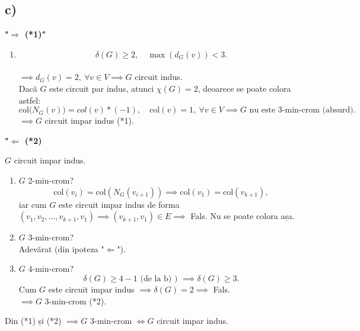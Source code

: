 \documentclass[a4paper,12pt]{article}
\begin{document}
\subsection*{c)}
\textbf{"$\Rightarrow$ (*1)"}\\

\begin{enumerate}
    \item 
        \[\delta(G) \geq 2, \quad \max(d_G(v)) < 3.\] \\
        $\implies d_G(v) = 2, \ \forall v \in V \implies G$ circuit indus. \\

    Dacă $G$ este circuit par indus, atunci $\chi(G) = 2$, deoarece se poate colora astfel: \\
    \[
    \text{col}\big(N_G(v)\big) = col(v) * (-1), \quad \text{col}(v) = 1, \ \forall v \in V \implies G \text{ nu este 3-min-crom (absurd).}
    \]
    $\implies G$ circuit impar indus (*1).
\end{enumerate}

\textbf{"$\Leftarrow$ (*2)}

$G$ circuit impar indus. \\
\begin{enumerate}
    \item $G$ 2-min-crom? \\
    \[
    \text{col}(v_i) = \text{col}(N_G(v_{i+1})) \implies \text{col}(v_1) = \text{col}(v_{k+1}),
    \]
    iar cum $G$ este circuit impar indus de forma $(v_1, v_2, \dots, v_{k+1}, v_1) \implies (v_{k+1}, v_1) \in E \implies$ Fals. Nu se poate colora așa.
    
    \item $G$ 3-min-crom? \\
    Adevărat (din ipoteza "$\Leftarrow$").
    
    \item $G$ 4-min-crom? \\
    \[
    \delta(G) \geq 4-1 \text{ (de la b) ) } \implies \delta(G) \geq 3. 
    \]
    Cum $G$ este circuit impar indus $\implies \delta(G) = 2 \implies$ Fals. \\

    $\implies G$ 3-min-crom (*2).
\end{enumerate}
Din (*1) și (*2) $\implies G$ 3-min-crom $\Longleftrightarrow G$ circuit impar indus.
\end{document}
